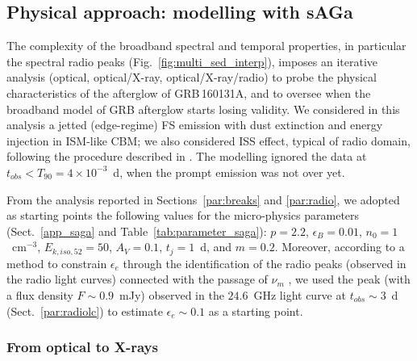 \documentclass{aa}
\begin{document}
\subsection{Physical approach: modelling with {\sc sAGa}}
\label{par:saga_results}

The complexity of the broadband spectral and temporal properties, in particular the spectral radio peaks (Fig.~\ref{fig:multi_sed_interp}), imposes an iterative analysis (optical, optical/X-ray, optical/X-ray/radio) to probe the physical characteristics of the afterglow of GRB\,160131A, and to oversee when the broadband model of GRB afterglow starts losing validity.
We considered in this analysis a jetted (edge-regime) FS emission with dust extinction and energy injection in ISM-like CBM; we also considered ISS effect, typical of radio domain, following the procedure described in \citet{Misra19}.
The modelling ignored the data at $t_{obs} < T_{90} = 4 \times 10^{-3}$~d, when the prompt emission was not over yet.

From the analysis reported in Sections~\ref{par:breaks} and \ref{par:radio}, we adopted as starting points the following values for the micro-physics parameters (Sect.~\ref{app_saga} and Table~\ref{tab:parameter_saga}): $p = 2.2$, $\epsilon_B = 0.01$, $n_0 = 1$~cm$^{-3}$, $E_{k,iso,52} = 50$, $A_V = 0.1$, $t_j =1$~d, and $m = 0.2$.
Moreover, according to a method to constrain $\epsilon_e$ through the identification of the radio peaks (observed in the radio light curves) connected with the passage of $\nu_m$ \citep{BeniaminivanderHorst17}, we used the peak (with a flux density $F \sim 0.9$~mJy) observed in the $24.6$~GHz light curve at $t_{obs} \sim 3$~d (Sect.~\ref{par:radiolc}) to estimate $\epsilon_e \sim 0.1$ as a starting point.


\subsubsection{From optical to X-rays}
\label{par:opt_res}
\end{document}
